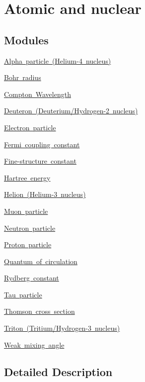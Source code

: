 \hypertarget{group___n_i_s_t_const-_atomic}{}\section{Atomic and nuclear}
\label{group___n_i_s_t_const-_atomic}
\subsection*{Modules}
\begin{DoxyCompactItemize}
\item 
\mbox{\hyperlink{group___n_i_s_t_const-_alpha}{Alpha particle (\+Helium-\/4 nucleus)}}
\item 
\mbox{\hyperlink{group___n_i_s_t_const-_bohr_radius}{Bohr radius}}
\item 
\mbox{\hyperlink{group___n_i_s_t_const-_compton_wavelength}{Compton Wavelength}}
\item 
\mbox{\hyperlink{group___n_i_s_t_const-_deuteron}{Deuteron (\+Deuterium/\+Hydrogen-\/2 nucleus)}}
\item 
\mbox{\hyperlink{group___n_i_s_t_const-_electron}{Electron particle}}
\item 
\mbox{\hyperlink{group___n_i_s_t_const-_fermi_coupling_constant}{Fermi coupling constant}}
\item 
\mbox{\hyperlink{group___n_i_s_t_const-_fine_structure_constant}{Fine-\/structure constant}}
\item 
\mbox{\hyperlink{group___n_i_s_t_const-_hartree_energy}{Hartree energy}}
\item 
\mbox{\hyperlink{group___n_i_s_t_const-_helion}{Helion (\+Helium-\/3 nucleus)}}
\item 
\mbox{\hyperlink{group___n_i_s_t_const-_muon}{Muon particle}}
\item 
\mbox{\hyperlink{group___n_i_s_t_const-_neutron}{Neutron particle}}
\item 
\mbox{\hyperlink{group___n_i_s_t_const-_proton}{Proton particle}}
\item 
\mbox{\hyperlink{group___n_i_s_t_const-_quantum_of_circulation}{Quantum of circulation}}
\item 
\mbox{\hyperlink{group___n_i_s_t_const-_rydberg_constant}{Rydberg constant}}
\item 
\mbox{\hyperlink{group___n_i_s_t_const-_tau}{Tau particle}}
\item 
\mbox{\hyperlink{group___n_i_s_t_const-_thomson}{Thomson cross section}}
\item 
\mbox{\hyperlink{group___n_i_s_t_const-_triton}{Triton (\+Tritium/\+Hydrogen-\/3 nucleus)}}
\item 
\mbox{\hyperlink{group___n_i_s_t_const-_weak_mixing_angle}{Weak mixing angle}}
\end{DoxyCompactItemize}


\subsection{Detailed Description}
